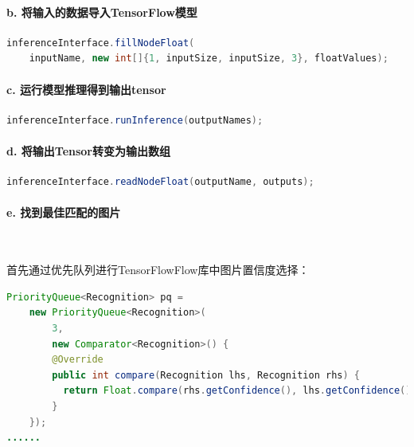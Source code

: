 \documentclass[UTF8, Microsoft YaHei]{book}
\begin{document}
	\paragraph{b. 将输入的数据导入TensorFlow模型}

\begin{small}
\begin{lstlisting}[language=java]
inferenceInterface.fillNodeFloat(                
    inputName, new int[]{1, inputSize, inputSize, 3}, floatValues);
\end{lstlisting}
\end{small}

	\paragraph{c. 运行模型推理得到输出tensor}

\begin{small}
\begin{lstlisting}[language=java]
inferenceInterface.runInference(outputNames);
\end{lstlisting}
\end{small}

	\paragraph{d. 将输出Tensor转变为输出数组}

\begin{small}
\begin{lstlisting}[language=java]
inferenceInterface.readNodeFloat(outputName, outputs);
\end{lstlisting}
\end{small}

	\paragraph{e. 找到最佳匹配的图片}

~

首先通过优先队列进行TensorFlowFlow库中图片置信度选择：

\begin{small}
\begin{lstlisting}[language=java]
PriorityQueue<Recognition> pq =
    new PriorityQueue<Recognition>(
        3,
        new Comparator<Recognition>() {
        @Override
        public int compare(Recognition lhs, Recognition rhs) {
          return Float.compare(rhs.getConfidence(), lhs.getConfidence());
        }
    });
......
\end{lstlisting}
\end{small}
\end{document}
